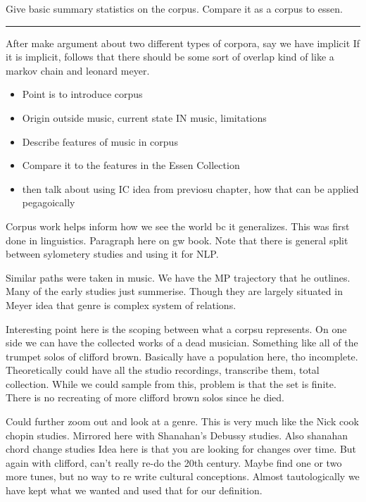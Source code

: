 \documentclass[]{book}
\providecommand{\tightlist}{%
  \setlength{\itemsep}{0pt}\setlength{\parskip}{0pt}}
\begin{document}
Give basic summary statistics on the corpus.
Compare it as a corpus to essen.

\begin{center}\rule{0.5\linewidth}{\linethickness}\end{center}

After make argument about two different types of corpora, say we have implicit
If it is implicit, follows that there should be some sort of overlap
kind of like a markov chain and leonard meyer.

\begin{itemize}
\tightlist
\item
  Point is to introduce corpus
\item
  Origin outside music, current state IN music, limitations
\item
  Describe features of music in corpus
\item
  Compare it to the features in the Essen Collection
\item
  then talk about using IC idea from previosu chapter, how that can be applied pegagoically
\end{itemize}

Corpus work helps inform how we see the world bc it generalizes.
This was first done in linguistics.
Paragraph here on gw book.
Note that there is general split between sylometery studies and using it for NLP.

Similar paths were taken in music.
We have the MP trajectory that he outlines.
Many of the early studies just summerise.
Though they are largely situated in Meyer idea that genre is complex system of relations.

Interesting point here is the scoping between what a corpsu represents.
On one side we can have the collected works of a dead musician.
Something like all of the trumpet solos of clifford brown.
Basically have a population here, tho incomplete.
Theoretically could have all the studio recordings, transcribe them, total collection.
While we could sample from this, problem is that the set is finite.
There is no recreating of more clifford brown solos since he died.

Could further zoom out and look at a genre.
This is very much like the Nick cook chopin studies.
Mirrored here with Shanahan's Debussy studies.
Also shanahan chord change studies
Idea here is that you are looking for changes over time.
But again with clifford, can't really re-do the 20th century.
Maybe find one or two more tunes, but no way to re write cultural conceptions.
Almost tautologically we have kept what we wanted and used that for our definition.
\end{document}

